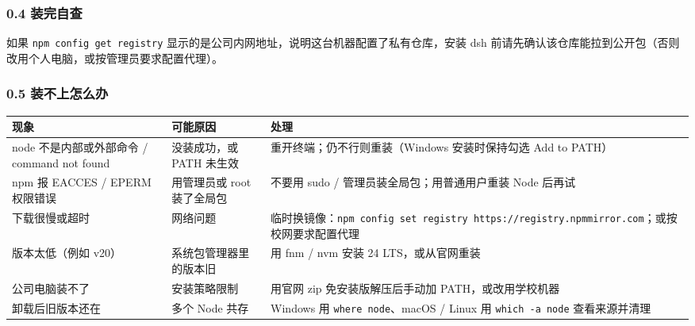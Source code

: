 \subsubsection{0.4 装完自查}\label{ux88c5ux5b8cux81eaux67e5}

\begin{Shaded}
\begin{Highlighting}[]
           
            
     
\end{Highlighting}
\end{Shaded}

如果 \texttt{npm\ config\ get\ registry}
显示的是公司内网地址，说明这台机器配置了私有仓库，安装 dsh
前请先确认该仓库能拉到公开包（否则改用个人电脑，或按管理员要求配置代理）。

\subsubsection{0.5
装不上怎么办}\label{ux88c5ux4e0dux4e0aux600eux4e48ux529e}

{\def\LTcaptype{none} %
\begin{longtable}[]{@{}
  >{\raggedright\arraybackslash}p{}
  >{\raggedright\arraybackslash}p{}
  >{\raggedright\arraybackslash}p{}@{}}
\toprule\noalign{}
\begin{minipage}[b]{\linewidth}\raggedright
现象
\end{minipage} & \begin{minipage}[b]{\linewidth}\raggedright
可能原因
\end{minipage} & \begin{minipage}[b]{\linewidth}\raggedright
处理
\end{minipage} \\
\midrule\noalign{}
\endhead
\bottomrule\noalign{}
\endlastfoot
node 不是内部或外部命令 / command not found & 没装成功，或 PATH 未生效 &
重开终端；仍不行则重装（Windows 安装时保持勾选 Add to PATH） \\
npm 报 EACCES / EPERM 权限错误 & 用管理员或 root 装了全局包 & 不要用
sudo / 管理员装全局包；用普通用户重装 Node 后再试 \\
下载很慢或超时 & 网络问题 &
临时换镜像：\texttt{npm\ config\ set\ registry\ https://registry.npmmirror.com}；或按校网要求配置代理 \\
版本太低（例如 v20） & 系统包管理器里的版本旧 & 用 fnm / nvm 安装 24
LTS，或从官网重装 \\
公司电脑装不了 & 安装策略限制 & 用官网 zip 免安装版解压后手动加
PATH，或改用学校机器 \\
卸载后旧版本还在 & 多个 Node 共存 & Windows 用
\texttt{where\ node}、macOS / Linux 用 \texttt{which\ -a\ node}
查看来源并清理 \\
\end{longtable}
}

